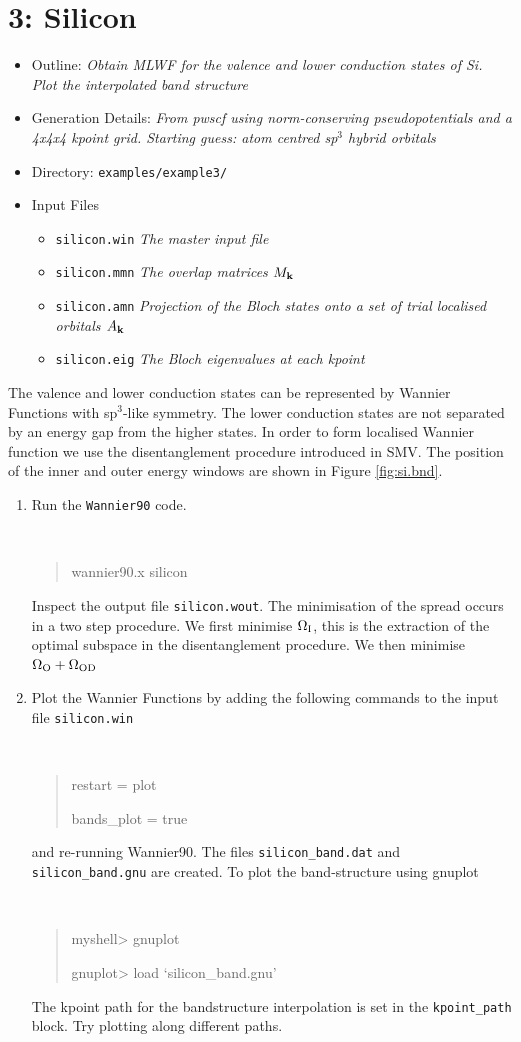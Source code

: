\documentclass[a4paper,11pt,twoside]{article}
\begin{document}
\cleardoublepage


\section*{3: Silicon}

\begin{itemize}
\item{Outline: \it{Obtain MLWF for the valence and lower conduction states of Si. Plot the interpolated band structure}}
\item{Generation Details: \it{From pwscf using norm-conserving pseudopotentials
and a 4x4x4 kpoint grid. Starting guess:  atom centred sp$^3$ hybrid orbitals}}
\item{Directory: {\tt examples/example3/}}
\item{Input Files}
\begin{itemize}
\item{ {\tt silicon.win}  {\it The master input file}}
\item{ {\tt silicon.mmn}  {\it The overlap matrices $M_{{\bf k}}$}}
\item{ {\tt silicon.amn}  {\it Projection of the Bloch states onto a set of trial localised orbitals $A_{{\bf k}}$}}
\item{ {\tt silicon.eig}  {\it The Bloch eigenvalues at each kpoint}}
\end{itemize}
\end{itemize}
The valence and lower conduction states can be represented by Wannier
Functions with sp$^3$-like symmetry. The lower conduction states are not
separated by an energy gap from the higher states. In order to form
localised Wannier function we use the disentanglement procedure
introduced in SMV. The position of the inner and outer energy windows
are shown in Figure \ref{fig:si.bnd}. 
\begin{enumerate}
\item Run the {\tt Wannier90} code.
{\tt
\begin{quote}
wannier90.x silicon
\end{quote} }
Inspect the output file {\tt silicon.wout}. The minimisation of the
spread occurs in a two step procedure. We first minimise $\Omega_{\rm
  I}$, this is the extraction of the optimal subspace in the
disentanglement procedure. We then minimise $\Omega_{\rm O}+\Omega_{{\rm
    OD}}$ 


\item Plot the Wannier Functions by adding the following commands to the input file {\tt silicon.win}
{\tt
\begin{quote}
restart = plot

bands\_plot = true
\end{quote} }
and re-running Wannier90. The files {\tt silicon\_band.dat} and {\tt silicon\_band.gnu} are created.
To plot the band-structure using gnuplot
\smallskip
{\tt
\begin{quote}
myshell> gnuplot

gnuplot> load `silicon\_band.gnu'
\end{quote} }
The kpoint path for the bandstructure interpolation is set in the {\tt kpoint\_path} block. Try plotting along different paths.
\end{enumerate}
\end{document}
